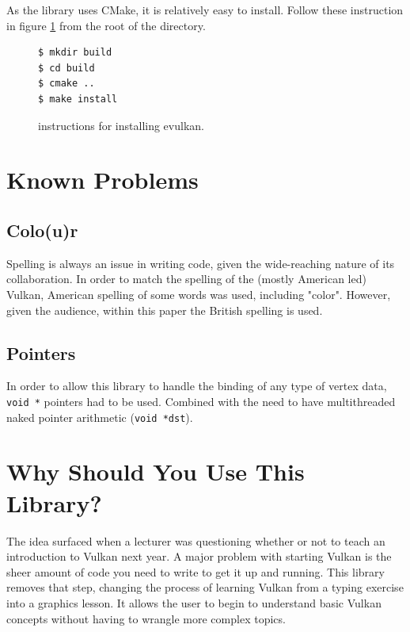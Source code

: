 \documentclass[12pt]{report}
\theoremstyle{definition}
\begin{document}
        As the library uses CMake, it is relatively easy to install. Follow
        these instruction in figure \ref{fig:installation} from the root of the directory.

          \begin{figure}
            \centering
            \begin{verbatim}
$ mkdir build
$ cd build
$ cmake ..
$ make install
            \end{verbatim}
            \caption{instructions for installing evulkan.}
            \label{fig:installation}
          \end{figure}   

    \section{Known Problems}

      \subsection{Colo(u)r}

        Spelling is always an issue in writing code, given the wide-reaching
        nature of its collaboration. In order to match the spelling of the
        (mostly American led) Vulkan, American spelling of some words was used,
        including "color". However, given the audience, within this paper the
        British spelling is used.

      \subsection{Pointers}

        In order to allow this library to handle the binding of any type of
        vertex data, \verb|void *| pointers had to be used. Combined with the need to
        have multithreaded naked pointer arithmetic (\verb|void *dst|).

    \section{Why Should You Use This Library?}

      The idea surfaced when a lecturer was questioning whether or not to teach
      an introduction to Vulkan next year. A major problem with starting Vulkan
      is the sheer amount of code you need to write to get it up and running.
      This library removes that step, changing the process of learning Vulkan
      from a typing exercise into a graphics lesson. It allows the user to
      begin to understand basic Vulkan concepts without having to wrangle more
      complex topics. \\
\end{document}
